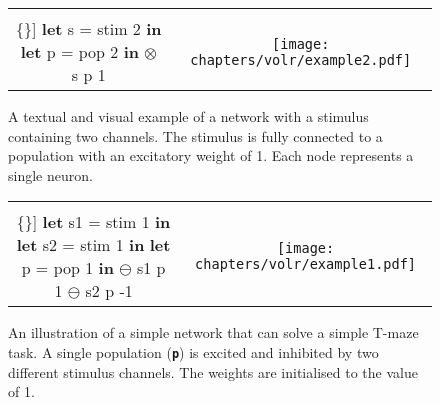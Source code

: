 \begin{figure}
  \ContinuedFloat*
  \begin{tabular}[t]{c c}
    \begin{minipage}{0.5\textwidth}
      \begin{Verbatim}[mathescape,commandchars=\\\{\}]
\textbf{let} s = stim 2 \textbf{in}
  \textbf{let} p = pop 2 \textbf{in}
      $\otimes$ s p 1
      \end{Verbatim}
    \end{minipage} & \begin{minipage}{0.5\textwidth}
      \texttt{[image: chapters/volr/example2.pdf]}
    \end{minipage}

  \end{tabular}
  \caption{A textual and visual example of a network
    with a stimulus containing two channels. 
    The stimulus is fully connected to a population with an excitatory
    weight of 1. Each node represents a single neuron.}
  \label{fig:volr-example1}
\end{figure}

\begin{figure}
  \ContinuedFloat
  \begin{tabular}[t]{c c}
    \begin{minipage}{0.5\textwidth}
      \begin{Verbatim}[mathescape,commandchars=\\\{\}]
\textbf{let} s1 = stim 1 \textbf{in}
  \textbf{let} s2 = stim 1 \textbf{in}
    \textbf{let} p = pop 1 \textbf{in}
      $\ominus$ s1 p 1
      $\ominus$ s2 p -1
      \end{Verbatim}
    \end{minipage} & \begin{minipage}{0.5\textwidth}
      \texttt{[image: chapters/volr/example1.pdf]}
    \end{minipage}
  \end{tabular}
  \caption{An illustration of a simple network that can solve a simple
    T-maze task. A single population (\texttt{\textbf{p}}) is 
    excited and inhibited by two different stimulus channels.
    The weights are initialised to the value of 1.}
  \label{fig:volr-example2}
\end{figure}

